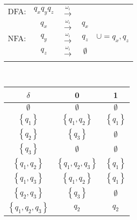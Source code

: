 \documentclass[
	final,
	a4paper,
	oneside,
	parskip=full,
	headings=standardclasses,
	headings=big,
	pointednumbers
]{scrartcl}
\begin{document}
	\begin{minipage}{0.6\textwidth}
        
        \begin{tabular}{l|ccc|l}
                \multicolumn{1}{c}{DFA:} & $q_xq_yq_z$ & $\xrightarrow{\omega_i}$ & \multicolumn{1}{c}{} & 
            \\  
                \cline{2-4}
                \multirow{3}{*}{NFA:}    & $q_x$ & $\xrightarrow{\omega_i}$ & $q_x$ & \multirow{3}{*}{$\cup = q_x,q_z$} 
            \\
                                         & $q_y$ & $\xrightarrow{\omega_i}$ & $q_z$ &
            \\
                                         & $q_z$ & $\xrightarrow{\omega_i}$ & $\emptyset$ &
            \\
                \cline{2-4}
                \multicolumn{1}{c}{} & & & \multicolumn{1}{c}{} &
            \\
        \end{tabular} \\
        \begin{tabular}{c|cc}
            $ \delta $                          & 0                                 & 1                         \\
            \hline
            $ \emptyset $                       & $\emptyset$                       & $\emptyset$               \\
            $ \left\{ q_1 \right\} $            & $\left\{ q_1, q_2 \right\}$       & $\left\{ q_1 \right\}$    \\
            $ \left\{ q_2 \right\} $            & $ \left\{ q_3 \right\}$           & $\emptyset$               \\
            $ \left\{ q_3 \right\} $            & $\emptyset$                       & $\emptyset$               \\
            $ \left\{ q_1, q_2 \right\} $       & $\left\{ q_1, q_2, q_3 \right\}$  & $\left\{ q_1 \right\}$    \\
            $ \left\{ q_1, q_3 \right\} $       & $\left\{ q_1, q_2 \right\}$       & $\left\{ q_1 \right\}$    \\
            $ \left\{ q_2, q_3 \right\} $       & $\left\{ q_3 \right\}$            & $\emptyset$               \\
            $ \left\{ q_1, q_2, q_3 \right\} $  & $q_2$ & $q_2$
        \end{tabular}
	\end{minipage}
\end{document}
